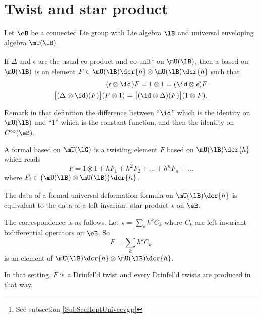 \section{Twist and star product}

Let $\eB$ be a connected Lie group with Lie algebra $\lB$ and universal enveloping algebra $\mU(\lB)$.

\begin{definition}
	If $\Delta$ and $\epsilon$ are the usual co-product and co-unit\footnote{See subsection \ref{SubSecHoptUnivecvgp}} on $\mU(\lB)$, then a  based on $\mU(\lB)$ is an element $F\in\mU(\lB)\dcr{h}\otimes\mU(\lB)\dcr{h}$ such that
	\begin{subequations}
		\begin{align}
			(\epsilon\otimes\id)F=1\otimes 1=(\id\otimes \epsilon)F					\label{subEqHpfun}	\\
			\big[ (\Delta\otimes\id)(F) \big](F\otimes 1)=\big[ (\id\otimes\Delta)(F) \big](1\otimes F).	\label{subEqHpfcocs}
		\end{align}
	\end{subequations}
\end{definition}
Remark in that definition the difference between ``$\id$'' which is the identity on $\mU(\lB)$ and ``$1$'' which is the constant function, and then the identity on $ C^{\infty}(\eB)$.

\begin{definition}
	A formal  based on $\mU(\lG)$ is a twisting element $F$ based on $\mU(\lB)\dcr{h}$ which reads
	\begin{equation}
		F=1\otimes 1+hF_1+h^2F_2+\ldots+h^nF_n+\ldots
	\end{equation}
	where $F_i\in\big( \mU(\lB)\otimes\mU(\lB) \big)\dcr{h}$.
\end{definition}

\begin{theorem}
	The data of a formal universal deformation formula on $\mU(\lB)\dcr{h}$ is equivalent to the data of a left invariant star product $\star$ on $\eB$.

	The correspondence is as follows. Let $\star=\sum_k h^kC_k$ where $C_k$ are left invariant bidifferential operators on $\eB$. So
	\begin{equation}
		F=\sum_kh^kC_k
	\end{equation}
	is an element of $\mU(\lB)\dcr{h}\otimes \mU(\lB)\dcr{h}$.

	In that setting, $F$ is a Drinfel'd twist and every Drinfel'd twists are produced in that way.
\end{theorem}

